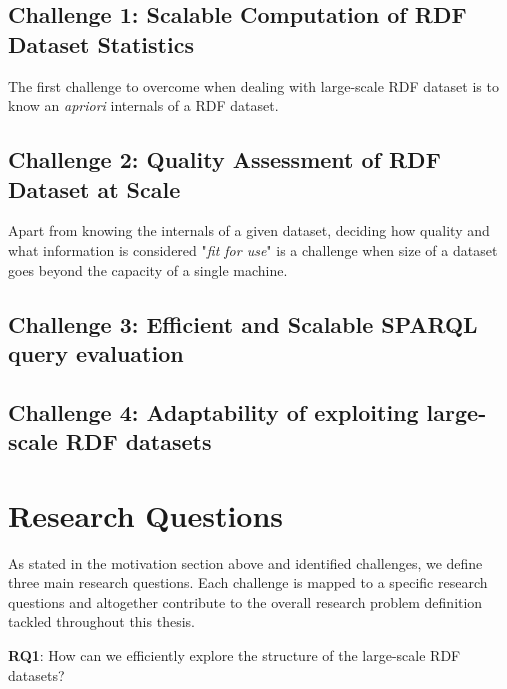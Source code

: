 \subsection{Challenge 1: Scalable Computation of RDF Dataset Statistics}
The first challenge to overcome when dealing with large-scale RDF dataset is to know an \textit{apriori} internals of a RDF dataset.

\subsection{Challenge 2: Quality Assessment of RDF Dataset at Scale}
Apart from knowing the internals of a given dataset, deciding how quality and what information is considered "\textit{fit for use}" is a challenge when size of a dataset goes beyond the capacity of a single machine.

\subsection{Challenge 3: Efficient and Scalable SPARQL query evaluation}


\subsection{Challenge 4: Adaptability of exploiting large-scale RDF datasets}


\section{Research Questions}
\label{sec:research-questions}

As stated in the motivation section above and identified challenges, we define three main research questions.
Each challenge is mapped to a specific research questions and altogether contribute to the overall research problem definition tackled throughout this thesis.

\begin{tcolorbox}
\textbf{RQ1}: How can we efficiently explore the structure of the large-scale RDF datasets?
\end{tcolorbox}

